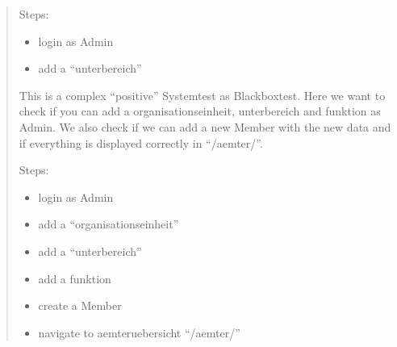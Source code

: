 \documentclass[letterpaper,10pt,english]{sphinxmanual}
\begin{document}
\begin{quote}
\begin{fulllineitems}
\begin{fulllineitems}
Steps:
\begin{itemize}
\item {} 
login as Admin

\item {} 
add a “unterbereich”

\end{itemize}

\end{fulllineitems}



\begin{fulllineitems}
This is a complex “positive” Systemtest as Blackboxtest.
Here we want to check if you can add a organisationseinheit, unterbereich and funktion as Admin.
We also check if we can add a new Member with the new data and if everything is displayed correctly
in “/aemter/”.

Steps:
\begin{itemize}
\item {} 
login as Admin

\item {} 
add a “organisationseinheit”

\item {} 
add a “unterbereich”

\item {} 
add a funktion

\item {} 
create a Member

\item {} 
navigate to aemteruebersicht “/aemter/”

\end{itemize}

\end{fulllineitems}


\end{fulllineitems}

\end{quote}
\end{document}
